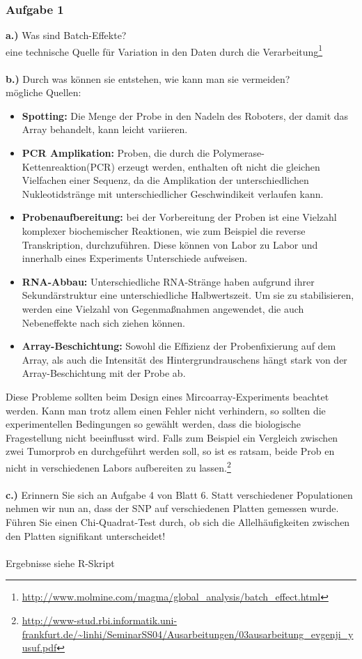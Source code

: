\subsubsection{Aufgabe 1}
\textbf{a.)} Was sind Batch-Effekte?\\
eine technische Quelle für Variation in den Daten durch die Verarbeitung\footnote{\url{http://www.molmine.com/magma/global_analysis/batch_effect.html}}
\\\\
\textbf{b.)} Durch was können sie entstehen, wie kann man sie vermeiden?\\
mögliche Quellen:
\begin{itemize}
	\item \textbf{Spotting:} Die Menge der Probe in den Nadeln des Roboters, der damit das Array behandelt, kann leicht variieren.
	\item \textbf{PCR Amplikation:} Proben, die durch die Polymerase-Kettenreaktion(PCR) erzeugt werden, enthalten oft nicht die gleichen Vielfachen einer Sequenz, da die Amplikation der unterschiedlichen Nukleotidstränge mit unterschiedlicher Geschwindikeit verlaufen kann.
	\item \textbf{Probenaufbereitung:} bei der Vorbereitung der Proben ist eine Vielzahl komplexer biochemischer Reaktionen, wie zum Beispiel die reverse Transkription, durchzuführen. Diese können von Labor zu Labor und innerhalb eines Experiments Unterschiede aufweisen.
	\item \textbf{RNA-Abbau:} Unterschiedliche RNA-Stränge haben aufgrund ihrer Sekundärstruktur eine unterschiedliche Halbwertszeit. Um sie zu stabilisieren, werden eine Vielzahl von Gegenmaßnahmen angewendet, die auch Nebeneffekte nach sich ziehen können.
	\item \textbf{Array-Beschichtung:} Sowohl die Effizienz der Probenfixierung auf dem Array, als auch die Intensität des Hintergrundrauschens hängt stark von der Array-Beschichtung mit der Probe ab.
\end{itemize}
Diese Probleme sollten beim Design eines Mircoarray-Experiments beachtet werden. Kann man trotz allem einen Fehler nicht verhindern, so sollten die experimentellen Bedingungen so gewählt werden, dass die biologische Fragestellung nicht beeinflusst wird. Falls zum Beispiel ein Vergleich zwischen zwei Tumorprob en durchgeführt werden soll, so ist es ratsam, beide Prob en nicht in verschiedenen Labors aufbereiten zu lassen.\footnote{\url{http://www-stud.rbi.informatik.uni-frankfurt.de/~linhi/SeminarSS04/Ausarbeitungen/03ausarbeitung_evgenji_yusuf.pdf}}
\\\\
\textbf{c.)} Erinnern Sie sich an Aufgabe 4 von Blatt 6. Statt verschiedener Populationen nehmen wir nun an, dass der SNP auf verschiedenen Platten gemessen wurde. Führen Sie einen Chi-Quadrat-Test durch, ob sich die Allelhäufigkeiten zwischen den Platten signifikant unterscheidet!\\\\
Ergebnisse siehe R-Skript